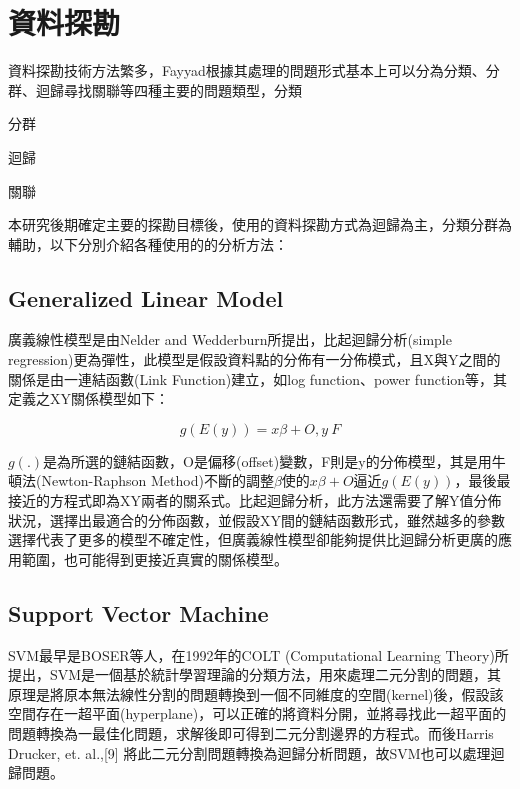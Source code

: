 \renewcommand\thetable{\arabic{chapter}-\arabic{table}}
\renewcommand{\theequation}{\arabic{chapter}-\arabic{equation}}
\chapter{資料探勘}

資料探勘技術方法繁多，Fayyad根據其處理的問題形式基本上可以分為分類、分群、迴歸尋找關聯等四種主要的問題類型，分類

分群

迴歸

關聯

本研究後期確定主要的探勘目標後，使用的資料探勘方式為迴歸為主，分類分群為輔助，以下分別介紹各種使用的的分析方法：

\section{Generalized Linear Model}

廣義線性模型是由Nelder and Wedderburn\cite{citeulike:5485398}所提出，比起迴歸分析(simple regression)更為彈性，此模型是假設資料點的分佈有一分佈模式，且X與Y之間的關係是由一連結函數(Link Function)建立，如log function、power function等，其定義之XY關係模型如下：

\begin{equation} g(E(y)) = x\beta + O, y~F \end{equation} 

$g(.)$是為所選的鏈結函數，O是偏移(offset)變數，F則是y的分佈模型，其是用牛頓法(Newton-Raphson Method)不斷的調整$\beta$使的$x\beta + O$逼近$g(E(y))$，最後最接近的方程式即為XY兩者的關系式。比起迴歸分析，此方法還需要了解Y值分佈狀況，選擇出最適合的分佈函數，並假設XY間的鏈結函數形式，雖然越多的參數選擇代表了更多的模型不確定性，但廣義線性模型卻能夠提供比迴歸分析更廣的應用範圍，也可能得到更接近真實的關係模型。

\section{Support Vector Machine}

SVM最早是BOSER\cite{boser1992}等人，在1992年的COLT (Computational Learning Theory)所提出，SVM是一個基於統計學習理論的分類方法，用來處理二元分割的問題，其原理是將原本無法線性分割的問題轉換到一個不同維度的空間(kernel)後，假設該空間存在一超平面(hyperplane)，可以正確的將資料分開，並將尋找此一超平面的問題轉換為一最佳化問題，求解後即可得到二元分割邊界的方程式。而後Harris Drucker, et. al.,[9] 將此二元分割問題轉換為迴歸分析問題，故SVM也可以處理迴歸問題。

